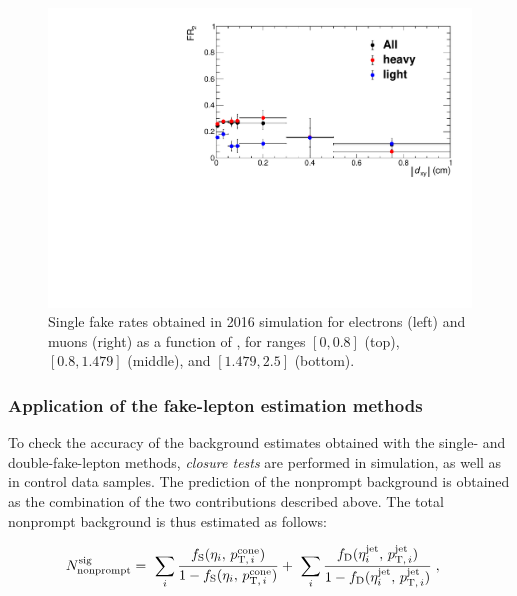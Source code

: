 \begin{figure}[h]
  \includegraphics[width=.48\textwidth]{Figures/c6/backgrounds/FR/sFR/QCD/dxy_mu_eta3_FR2.pdf}
  \caption{Single fake rates obtained in 2016 simulation for electrons
    (left) and muons (right) as
    a function of \dxy, for \abseta ranges $[0,0.8]$ (top),
    $[0.8,1.479]$ (middle), and $[1.479,2.5]$ (bottom).}
  \label{fig:sfr_dxy}
\end{figure}
\clearpage
\subsubsection{Application of the fake-lepton estimation methods}\label{sec:frChecks}
To check the accuracy of the background estimates obtained with the
single- and double-fake-lepton methods, \emph{closure tests} are
performed in simulation, as well as in control data samples. 
The prediction of the nonprompt background is obtained as the
combination of the two contributions described above. The total
nonprompt background is thus estimated as follows:
\begin{linenomath}
  \begin{align*}
    N_{\mathrm{nonprompt}}^{\mathrm{sig}} & =~ 
    \sum_i\frac{f_{\mathrm{S}}(\eta_i,\,p_{\mathrm{T,\,}i}^{\mathrm{cone}})}{1-f_{\mathrm{S}}(\eta_i,\,p_{\mathrm{T,\,}i}^{\mathrm{cone}})}
    +~
    \sum_i\frac{f_{\mathrm{D}}(\eta^{\mathrm{jet}}_i,\,p_{\mathrm{T,\,}i}^{\mathrm{jet}})}{1-f_{\mathrm{D}}(\eta^{\mathrm{jet}}_i,\,p_{\mathrm{T,\,}i}^{\mathrm{jet}})}\;,
  \end{align*}
\end{linenomath}

